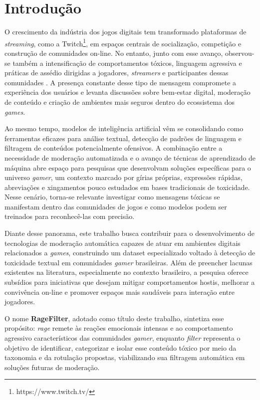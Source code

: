 \documentclass{eic-bcc-tcc}
\begin{document}
\tableofcontentspage

\mainmatter

\chapter{Introdução}
\label{cha:introducao}

O crescimento da indústria dos jogos digitais tem transformado plataformas de \textit{streaming}, como a Twitch\footnote{https://www.twitch.tv/}, em espaços centrais de socialização, competição e construção de comunidades on-line. No entanto, junto com esse avanço, observou-se também a intensificação de comportamentos tóxicos, linguagem agressiva e práticas de assédio dirigidas a jogadores, \textit{streamers} e participantes dessas comunidades \cite{gam3sgg}. A presença constante desse tipo de mensagem compromete a experiência dos usuários e levanta discussões sobre bem-estar digital, moderação de conteúdo e criação de ambientes mais seguros dentro do ecossistema dos \textit{games}.

Ao mesmo tempo, modelos de inteligência artificial vêm se consolidando como ferramentas eficazes para análise textual, detecção de padrões de linguagem e filtragem de conteúdos potencialmente ofensivos. A combinação entre a necessidade de moderação automatizada e o avanço de técnicas de aprendizado de máquina abre espaço para pesquisas que desenvolvam soluções específicas para o universo \textit{gamer}, um contexto marcado por gírias próprias, expressões rápidas, abreviações e xingamentos pouco estudados em bases tradicionais de toxicidade. Nesse cenário, torna-se relevante investigar como mensagens tóxicas se manifestam dentro das comunidades de jogos e como modelos podem ser treinados para reconhecê-las com precisão.

Diante desse panorama, este trabalho busca contribuir para o desenvolvimento de tecnologias de moderação automática capazes de atuar em ambientes digitais relacionados a \textit{games}, construindo um dataset especializado voltado à detecção de toxicidade textual em comunidades \textit{gamer} brasileiras. Além de preencher lacunas existentes na literatura, especialmente no contexto brasileiro, a pesquisa oferece subsídios para iniciativas que desejam mitigar comportamentos hostis, melhorar a convivência on-line e promover espaços mais saudáveis para interação entre jogadores.

O nome \textbf{RageFilter}, adotado como título deste trabalho, sintetiza esse propósito: \textit{rage} remete às reações emocionais intensas e ao comportamento agressivo característicos das comunidades \textit{gamer}, enquanto \textit{filter} representa o objetivo de identificar, categorizar e isolar esse conteúdo tóxico por meio da taxonomia e da rotulação propostas, viabilizando sua filtragem automática em soluções futuras de moderação.
\end{document}
